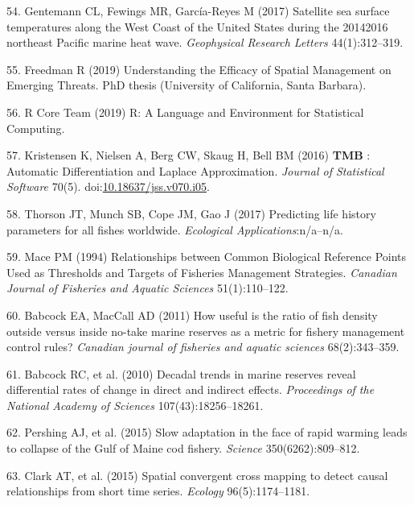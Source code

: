 \documentclass[9pt,twocolumn,twoside,lineno]{pnas-new}
\begin{document}
\leavevmode\hypertarget{ref-gentemann2017}{}%
54. Gentemann CL, Fewings MR, García-Reyes M (2017) Satellite sea
surface temperatures along the West Coast of the United States during
the 20142016 northeast Pacific marine heat wave. \emph{Geophysical
Research Letters} 44(1):312--319.

\leavevmode\hypertarget{ref-freedman2019}{}%
55. Freedman R (2019) Understanding the Efficacy of Spatial Management
on Emerging Threats. PhD thesis (University of California, Santa
Barbara).

\leavevmode\hypertarget{ref-rcoreteam2019}{}%
56. R Core Team (2019) R: A Language and Environment for Statistical
Computing.

\leavevmode\hypertarget{ref-kristensen2016}{}%
57. Kristensen K, Nielsen A, Berg CW, Skaug H, Bell BM (2016)
\textbf{TMB} : Automatic Differentiation and Laplace Approximation.
\emph{Journal of Statistical Software} 70(5).
doi:\href{https://doi.org/10.18637/jss.v070.i05}{10.18637/jss.v070.i05}.

\leavevmode\hypertarget{ref-thorson2017c}{}%
58. Thorson JT, Munch SB, Cope JM, Gao J (2017) Predicting life history
parameters for all fishes worldwide. \emph{Ecological
Applications}:n/a--n/a.

\leavevmode\hypertarget{ref-mace1994}{}%
59. Mace PM (1994) Relationships between Common Biological Reference
Points Used as Thresholds and Targets of Fisheries Management
Strategies. \emph{Canadian Journal of Fisheries and Aquatic Sciences}
51(1):110--122.

\leavevmode\hypertarget{ref-babcock2011}{}%
60. Babcock EA, MacCall AD (2011) How useful is the ratio of fish
density outside versus inside no-take marine reserves as a metric for
fishery management control rules? \emph{Canadian journal of fisheries
and aquatic sciences} 68(2):343--359.

\leavevmode\hypertarget{ref-babcock2010}{}%
61. Babcock RC, et al. (2010) Decadal trends in marine reserves reveal
differential rates of change in direct and indirect effects.
\emph{Proceedings of the National Academy of Sciences}
107(43):18256--18261.

\leavevmode\hypertarget{ref-pershing2015a}{}%
62. Pershing AJ, et al. (2015) Slow adaptation in the face of rapid
warming leads to collapse of the Gulf of Maine cod fishery.
\emph{Science} 350(6262):809--812.

\leavevmode\hypertarget{ref-clark2015}{}%
63. Clark AT, et al. (2015) Spatial convergent cross mapping to detect
causal relationships from short time series. \emph{Ecology}
96(5):1174--1181.



% 
\end{document}
